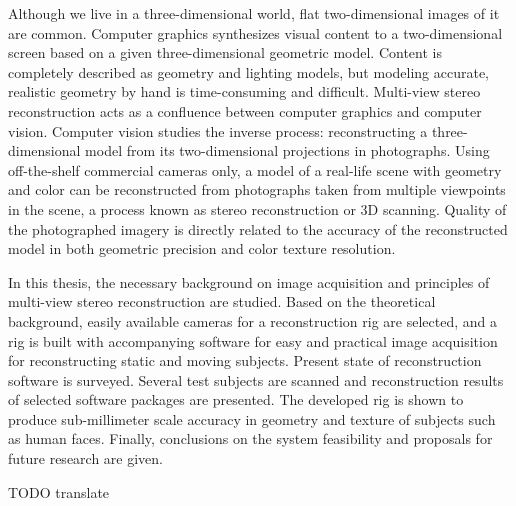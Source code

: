 \begin{abstractpage}[english]
Although we live in a three-dimensional world, flat two-dimensional images of it are common.
Computer graphics synthesizes visual content to a two-dimensional screen based on a given three-dimensional geometric model.
Content is completely described as geometry and lighting models, but modeling accurate, realistic geometry by hand is time-consuming and difficult.
Multi-view stereo reconstruction acts as a confluence between computer graphics and computer vision.
Computer vision studies the inverse process: reconstructing a three-dimensional model from its two-dimensional projections in photographs.
Using off-the-shelf commercial cameras only, a model of a real-life scene with geometry and color can be reconstructed from photographs taken from multiple viewpoints in the scene, a process known as stereo reconstruction or 3D scanning.
Quality of the photographed imagery is directly related to the accuracy of the reconstructed model in both geometric precision and color texture resolution.

In this thesis, the necessary background on image acquisition and principles of multi-view stereo reconstruction are studied.
Based on the theoretical background, easily available cameras for a reconstruction rig are selected, and a rig is built with accompanying software for easy and practical image acquisition for reconstructing static and moving subjects.
Present state of reconstruction software is surveyed.
Several test subjects are scanned and reconstruction results of selected software packages are presented.
The developed rig is shown to produce sub-millimeter scale accuracy in geometry and texture of subjects such as human faces.
Finally, conclusions on the system feasibility and proposals for future research are given.
\end{abstractpage}

\newpage

\keywords{}
\begin{abstractpage}[finnish]
	TODO translate
\end{abstractpage}
